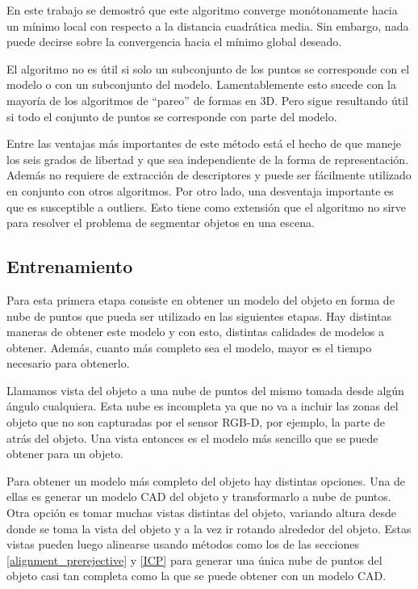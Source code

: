 En este trabajo se demostró que este algoritmo converge monótonamente hacia un mínimo local con respecto a la distancia cuadrática media. Sin embargo, nada puede decirse sobre la convergencia hacia el mínimo global deseado.

El algoritmo no es útil si solo un subconjunto de los puntos se corresponde con el modelo o con un subconjunto del modelo. Lamentablemente esto sucede con la mayoría de los algoritmos de ``pareo'' de formas en 3D. Pero sigue resultando útil si todo el conjunto de puntos se corresponde con parte del modelo.

Entre las ventajas más importantes de este método está el hecho de que maneje los seis grados de libertad y que sea independiente de la forma de representación. Además no requiere de extracción de descriptores y puede ser fácilmente utilizado en conjunto con otros algoritmos. Por otro lado, una desventaja importante es que es susceptible a outliers. Esto tiene como extensión que el algoritmo no sirve para resolver el problema de segmentar objetos en una escena.



\subsection{Entrenamiento}
Para esta primera etapa consiste en obtener un modelo del objeto en forma de nube de puntos que pueda ser utilizado en las siguientes etapas. Hay distintas maneras de obtener este modelo y con esto, distintas calidades de modelos a obtener. Además, cuanto más completo sea el modelo, mayor es el tiempo necesario para obtenerlo.

Llamamos vista del objeto a una nube de puntos del mismo tomada desde algún ángulo cualquiera. Esta nube es incompleta ya que no va a incluir las zonas del objeto que no son capturadas por el sensor RGB-D, por ejemplo, la parte de atrás del objeto. Una vista entonces es el modelo más sencillo que se puede obtener para un objeto.

Para obtener un modelo más completo del objeto hay distintas opciones. Una de ellas es generar un modelo CAD del objeto y transformarlo a nube de puntos. Otra opción es tomar muchas vistas distintas del objeto, variando altura desde donde se toma la vista del objeto y a la vez ir rotando alrededor del objeto. Estas vistas pueden luego alinearse usando métodos como los de las secciones \ref{alignment_prerejective} y \ref{ICP} para generar una única nube de puntos del objeto casi tan completa como la que se puede obtener con un modelo CAD.

